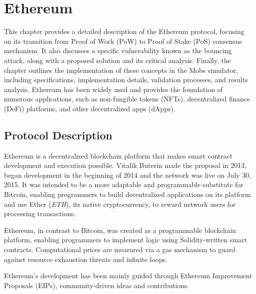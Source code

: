 
%

\chapter{Ethereum}\label{cha:ethereum}

This chapter provides a detailed description of the Ethereum protocol, 
focusing on its transition from Proof of Work (PoW) to Proof of Stake (PoS) consensus mechanism. 
It also discusses a specific vulnerability known as the bouncing attack, along with a proposed solution and its critical analysis. 
Finally, the chapter outlines the implementation of these concepts in the Mobs simulator, 
including specifications, implementation details, validation processes, and results analysis.
Ethereum has been widely used and provides the foundation of numerous applications, such as non-fungible tokens (NFTs), decentralized finance (DeFi) platforms, and other decentralized apps (dApps).

\section{Protocol Description}\label{sub:protocol_description}

Ethereum is a decentralized blockchain platform that makes smart contract development and execution possible.
Vitalik Buterin made the proposal in 2013, began development in the beginning of 2014 and the network was live on July 30, 2015.
It was intended to be a more adaptable and programmable substitute for Bitcoin, enabling programmers to build decentralized
applications on its platform and use Ether (\textit{ETH}), its native cryptocurrency, to reward network users for processing transactions.

Ethereum, in contrast to Bitcoin, was created as a programmable blockchain platform, enabling programmers to implement logic using Solidity-written smart contracts.
Computational prices are measured via a gas mechanism to guard against resource exhaustion threats and infinite loops.

Ethereum's development has been mainly guided through Ethereum Improvement Proposals (EIPs), community-driven ideas and contributions.

